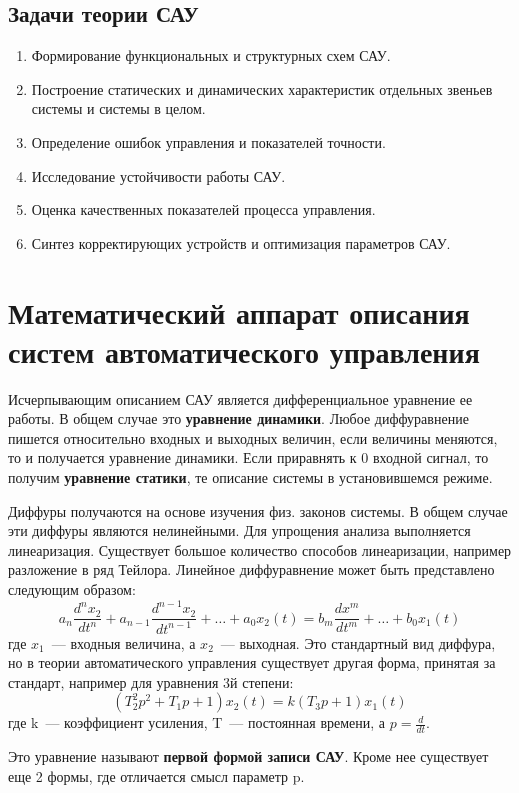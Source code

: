 \subsection{Задачи теории САУ}
\begin{enumerate}
	\item Формирование функциональных и структурных схем САУ.
	\item Построение статических и динамических характеристик отдельных звеньев системы и системы в целом.
	\item Определение ошибок управления и показателей точности.
	\item Исследование устойчивости работы САУ.
	\item Оценка качественных показателей процесса управления.
	\item Синтез корректирующих устройств и оптимизация параметров САУ.
\end{enumerate}

\section{Математический аппарат описания систем автоматического управления}
Исчерпывающим описанием САУ является дифференциальное уравнение ее работы. В общем случае это \textbf{уравнение динамики}. Любое диффуравнение пишется относительно входных и выходных величин, если величины меняются, то и получается уравнение динамики. Если приравнять к 0 входной сигнал, то получим \textbf{уравнение статики}, те описание системы в установившемся режиме.

Диффуры получаются на основе изучения физ. законов системы. В общем случае эти диффуры являются нелинейными. Для упрощения анализа выполняется линеаризация. Существует большое количество способов линеаризации, например разложение в ряд Тейлора. Линейное диффуравнение может быть представлено следующим образом:
	$$
	a_n\frac{d^nx_2}{dt^n}+a_{n-1}\frac{d^{n-1}x_2}{dt^{n-1}}+\ldots+a_0x_2(t)=b_m\frac{dx^m}{dt^m}+\ldots+b_0x_1(t)
	$$
где $x_1$~--- входныя величина, а $x_2$~--- выходная. Это стандартный вид диффура, но в теории автоматического управления существует другая форма, принятая за стандарт, например для уравнения 3й степени:
	$$
	(T^2_2p^2+T_1p+1)x_2(t)=k(T_3p+1)x_1(t)
	$$
где k~--- коэффициент усиления, T~--- постоянная времени, а $p=\frac{d}{dt}$.

Это уравнение называют \textbf{первой формой записи САУ}. Кроме нее существует еще 2 формы, где отличается смысл параметр p.

